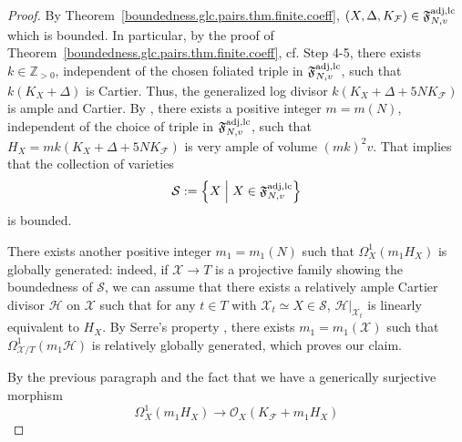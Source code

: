 \documentclass[12pt, a4paper]{amsart}
\newcommand{\setfoliation}[1]{\mathfrak F^{\rm adj, #1}_{N, v}}
\newcounter{Theorem}
\theoremstyle{definition}
\theoremstyle{named}
\begin{document}
\begin{proof}
		By Theorem~\ref{boundedness.glc.pairs.thm.finite.coeff}, 
		$(X, \Delta, K_\mathcal{F}) 
		\in \setfoliation{lc}$
		which is bounded.
		In particular, by the proof of Theorem~\ref{boundedness.glc.pairs.thm.finite.coeff}, 
		cf. Step 4-5, there exists 
		$k \in \mathbb Z_{>0}$,
		independent of the chosen foliated triple in 
		$\setfoliation{lc}$,
		such that  
		$k(K_X+\Delta)$ is Cartier.
		Thus, the generalized log divisor
		$k(K_X+\Delta+5NK_\mathcal{F})$ 
		is ample and Cartier.
		By
		\cite[Theorem~1.1]{fujino-2016}, 
		there exists a positive integer 
		$m=m(N)$, 
		independent of the choice of triple in 
		$\setfoliation{lc}$, 
		such that 
		$H_X=mk (K_X+\Delta+5NK_\mathcal{F})$
		is very ample of volume 
		$(mk)^2v$.
		That implies that the collection of varieties 
		\begin{align*}
		\mathcal S :=
		\left \{
		X \;
		\middle \vert \;
		X \in \setfoliation{lc}
		\right \}
		\end{align*}
		is bounded.
		
		There exists another positive integer 
		$m_1=m_1(N)$ 
		such that 		
		$\Omega^1_X(m_1H_X)$
		is globally generated:
 		indeed, if 
 		$\mathcal X \to T$ 
 		is a projective family showing the boundedness of 
		$\mathcal S$, 
		we can assume that there exists a relatively ample Cartier divisor 
		$\mathcal H$
		on 
		$\mathcal X$
		such that for any 
		$t \in T$ with 
		$\mathcal X_t \simeq X \in \mathcal S$, 
		$\mathcal H\vert_{\mathcal X_t}$
		is linearly equivalent to $H_X$.
		By Serre's property
		\cite[Theorem II.5.17]{Hartshorne77}, 
		there exists 
		$m_1=m_1(\mathcal X)$ 
		such that 
		$\Omega^1_{\mathcal X/T}(m_1\mathcal H)$
		is relatively globally generated, which proves our claim.
		
		By the previous paragraph 
        and the fact that we have a generically surjective morphism 
        \[\Omega^{1}_X(m_1H_X) \to \mathcal O_X(K_{\mathcal F}+m_1H_X)\] 
       

\end{proof}
\end{document}
